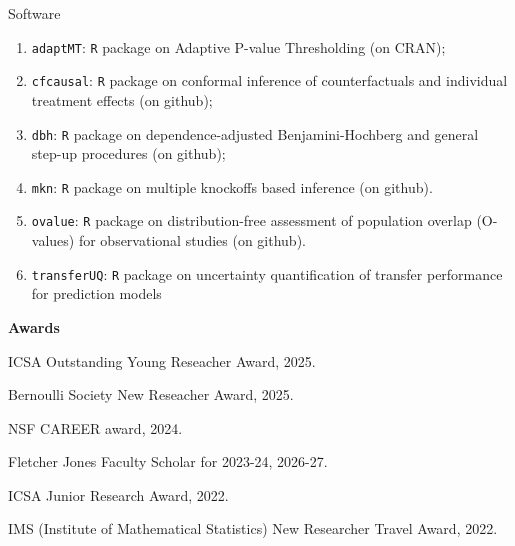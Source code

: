 \documentclass{article}
\begin{document}
\begin{large}
\noindent Software
\end{large}

\begin{enumerate}
\item \texttt{adaptMT}: \texttt{R} package on Adaptive P-value Thresholding (on CRAN);
\item \texttt{cfcausal}: \texttt{R} package on conformal inference of counterfactuals and individual treatment effects (on github);
\item \texttt{dbh}: \texttt{R} package on dependence-adjusted Benjamini-Hochberg and general step-up procedures (on github);
\item \texttt{mkn}: \texttt{R} package on multiple knockoffs based inference (on github).
\item \texttt{ovalue}: \texttt{R} package on distribution-free assessment of population overlap (O-values) for observational studies (on github).
\item \texttt{transferUQ}: \texttt{R} package on uncertainty quantification of transfer performance for prediction models
\end{enumerate}

\vspace{3mm}
\begin{large}
\noindent \textbf{Awards}
\end{large}

\vspace{5mm}

ICSA Outstanding Young Reseacher Award, 2025.

\vspace{2mm}

Bernoulli Society New Reseacher Award, 2025.

\vspace{2mm}

NSF CAREER award, 2024.

\vspace{2mm}

Fletcher Jones Faculty Scholar for 2023-24, 2026-27. 

\vspace{2mm}

ICSA Junior Research Award, 2022.

\vspace{2mm}

IMS (Institute of Mathematical Statistics) New Researcher Travel Award, 2022.

\vspace{2mm}
\end{document}
